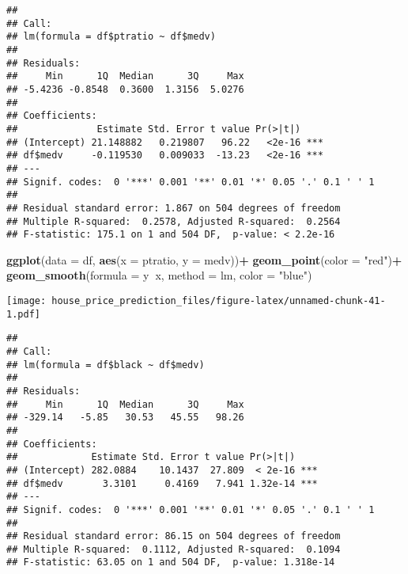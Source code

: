 \documentclass[
]{article}
\newenvironment{Shaded}{\begin{snugshade}}{\end{snugshade}}
\newcommand{\DataTypeTok}[1]{\textcolor[rgb]{0.13,0.29,0.53}{#1}}
\newcommand{\KeywordTok}[1]{\textcolor[rgb]{0.13,0.29,0.53}{\textbf{#1}}}
\newcommand{\NormalTok}[1]{#1}
\newcommand{\OperatorTok}[1]{\textcolor[rgb]{0.81,0.36,0.00}{\textbf{#1}}}
\newcommand{\StringTok}[1]{\textcolor[rgb]{0.31,0.60,0.02}{#1}}
\begin{document}
\begin{verbatim}
## 
## Call:
## lm(formula = df$ptratio ~ df$medv)
## 
## Residuals:
##     Min      1Q  Median      3Q     Max 
## -5.4236 -0.8548  0.3600  1.3156  5.0276 
## 
## Coefficients:
##              Estimate Std. Error t value Pr(>|t|)    
## (Intercept) 21.148882   0.219807   96.22   <2e-16 ***
## df$medv     -0.119530   0.009033  -13.23   <2e-16 ***
## ---
## Signif. codes:  0 '***' 0.001 '**' 0.01 '*' 0.05 '.' 0.1 ' ' 1
## 
## Residual standard error: 1.867 on 504 degrees of freedom
## Multiple R-squared:  0.2578, Adjusted R-squared:  0.2564 
## F-statistic: 175.1 on 1 and 504 DF,  p-value: < 2.2e-16
\end{verbatim}

\begin{Shaded}
\begin{Highlighting}[]
\KeywordTok{ggplot}\NormalTok{(}\DataTypeTok{data =}\NormalTok{ df, }\KeywordTok{aes}\NormalTok{(}\DataTypeTok{x =}\NormalTok{ ptratio, }\DataTypeTok{y =}\NormalTok{ medv))}\OperatorTok{+}
\StringTok{  }\KeywordTok{geom_point}\NormalTok{(}\DataTypeTok{color =} \StringTok{"red"}\NormalTok{)}\OperatorTok{+}
\StringTok{  }\KeywordTok{geom_smooth}\NormalTok{(}\DataTypeTok{formula =}\NormalTok{ y}\OperatorTok{~}\NormalTok{x, }\DataTypeTok{method =}\NormalTok{ lm, }\DataTypeTok{color =} \StringTok{"blue"}\NormalTok{)}
\end{Highlighting}
\end{Shaded}

\texttt{[image: house\_price\_prediction\_files/figure-latex/unnamed-chunk-41-1.pdf]}

\begin{Shaded}
\end{Shaded}

\begin{verbatim}
## 
## Call:
## lm(formula = df$black ~ df$medv)
## 
## Residuals:
##     Min      1Q  Median      3Q     Max 
## -329.14   -5.85   30.53   45.55   98.26 
## 
## Coefficients:
##             Estimate Std. Error t value Pr(>|t|)    
## (Intercept) 282.0884    10.1437  27.809  < 2e-16 ***
## df$medv       3.3101     0.4169   7.941 1.32e-14 ***
## ---
## Signif. codes:  0 '***' 0.001 '**' 0.01 '*' 0.05 '.' 0.1 ' ' 1
## 
## Residual standard error: 86.15 on 504 degrees of freedom
## Multiple R-squared:  0.1112, Adjusted R-squared:  0.1094 
## F-statistic: 63.05 on 1 and 504 DF,  p-value: 1.318e-14
\end{verbatim}
\end{document}
